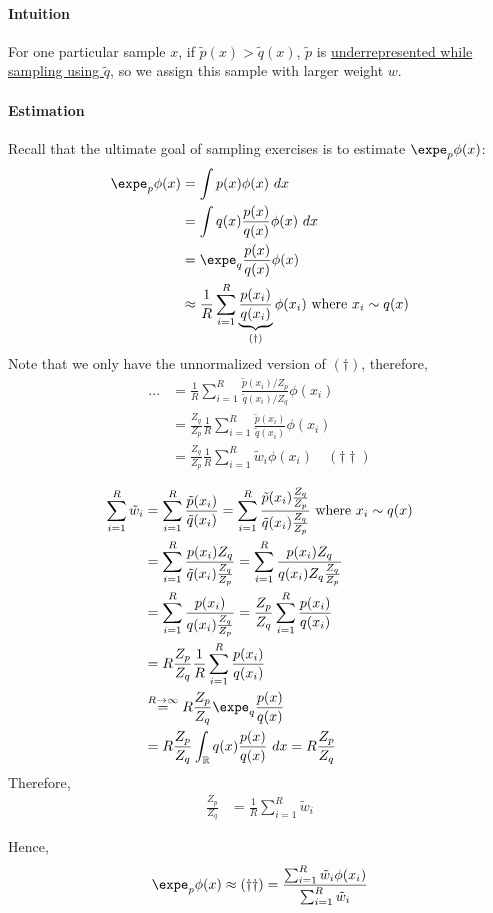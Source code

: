 \documentclass{article}
\begin{document}
	\paragraph{Intuition} For one particular sample $x$, if $\tilde{p}(x) > \tilde{q}(x)$, $\tilde{p}$ is \ul{underrepresented while sampling using $\tilde{q}$}, so we assign this sample with larger weight $w$.
	
	\paragraph{Estimation} Recall that the ultimate goal of sampling exercises is to estimate $\expe_p \phi(x)$:
	\begin{align}
		\expe_p \phi(x) &= \int p(x) \phi(x)\ dx \\
		&= \int q(x) \frac{p(x)}{q(x)} \phi(x)\ dx \\
		&= \expe_q \frac{p(x)}{q(x)} \phi(x) \\
		&\approx \frac{1}{R} \sum_{i=1}^R \underbrace{\frac{p(x_i)}{q(x_i)}}_{(\dagger)} \phi(x_i) \tx{ where } x_i \sim q(x)
	\end{align}
	Note that we only have the unnormalized version of $(\dagger)$, therefore,
	\begin{align}
		... &= \frac{1}{R} \sum_{i=1}^R \frac{\tilde{p}(x_i)/Z_p}{\tilde{q}(x_i)/Z_q} \phi(x_i) \\
		&= \frac{Z_q}{Z_p} \frac{1}{R} \sum_{i=1}^R \frac{\tilde{p}(x_i)}{\tilde{q}(x_i)}\phi(x_i) \\
		&= \frac{Z_q}{Z_p} \frac{1}{R} \sum_{i=1}^R \tilde{w}_i \phi(x_i)\quad (\dagger \dagger)
	\end{align}
	\begin{lemma}
		\begin{align}
			\sum_{i=1}^R \tilde{w}_i
			&= \sum_{i=1}^R \frac{\tilde{p}(x_i)}{\tilde{q}(x_i)}
			= \sum_{i=1}^R \frac{\tilde{p}(x_i) \frac{Z_q}{Z_p}}{\tilde{q}(x_i) \frac{Z_q}{Z_p}} \tx{ where } x_i \sim q(x) \\
			&= \sum_{i=1}^R \frac{p(x_i) Z_q}{\tilde{q}(x_i) \frac{Z_q}{Z_p}} 
			= \sum_{i=1}^R \frac{p(x_i) Z_q}{q(x_i) Z_q \frac{Z_q}{Z_p}} \\
			&= \sum_{i=1}^R \frac{p(x_i)}{q(x_i) \frac{Z_q}{Z_p}}
			= \frac{Z_p}{Z_q} \sum_{i=1}^R \frac{p(x_i)}{q(x_i)} \\
			&= R \frac{Z_p}{Z_q} \frac{1}{R} \sum_{i=1}^R \frac{p(x_i)}{q(x_i)} \\
			&\overset{R \to \infty}{=} R \frac{Z_p}{Z_q} \expe_q \frac{p(x)}{q(x)} \\
			&= R \frac{Z_p}{Z_q} \int_\R q(x) \frac{p(x)}{q(x)}\ dx
			= R \frac{Z_p}{Z_q}
		\end{align}
		Therefore, 
		\begin{align}
			\frac{Z_p}{Z_q} &= \frac{1}{R} \sum_{i=1}^R \tilde{w}_i
		\end{align}
	\end{lemma}
	Hence,
	\begin{align}
		\expe_p \phi(x) \approx (\dagger \dagger) = \frac{\sum_{i=1}^R \tilde{w}_i \phi(x_i)}{\sum_{i=1}^R \tilde{w}_i}
	\end{align}
\end{document}
